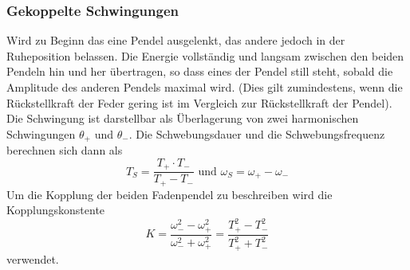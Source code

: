     \subsubsection{Gekoppelte Schwingungen}
        Wird zu Beginn das eine Pendel ausgelenkt, das andere jedoch in der Ruheposition 
        belassen. Die Energie vollständig und langsam zwischen den beiden Pendeln hin und her übertragen, so dass 
        eines der Pendel still steht, sobald die Amplitude des anderen Pendels maximal wird.
        (Dies gilt zumindestens, wenn die Rückstellkraft der Feder gering ist im Vergleich 
        zur Rückstellkraft der Pendel). Die Schwingung ist darstellbar als Überlagerung von 
        zwei harmonischen Schwingungen $\theta_+$ und $\theta_-$. Die Schwebungsdauer und 
        die Schwebungsfrequenz berechnen sich dann als 
        \begin{equation}
            T_S = \dfrac{T_+\cdot T_-}{T_+ - T_-} \text{ und } \omega_S=\omega_+ - \omega_-
        \end{equation}
        Um die Kopplung der beiden Fadenpendel zu beschreiben wird die Kopplungskonstente
        \begin{equation}
            K=\dfrac{\omega_-^2 - \omega_+^2}{\omega_-^2 + \omega_+^2}=
            \dfrac{T_+^2 - T_-^2}{T_+^2 + T_-^2}
        \end{equation}
        verwendet.